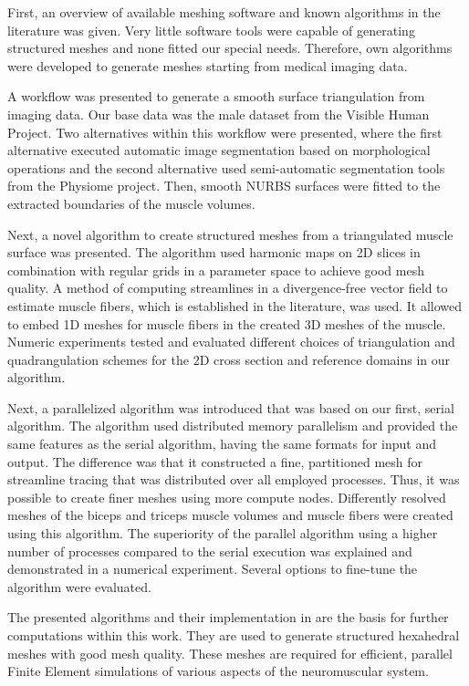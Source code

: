 First, an overview of available meshing software and known algorithms in the literature was given. Very little software tools were capable of generating structured meshes and none fitted our special needs. Therefore, own algorithms were developed to generate meshes starting from medical imaging data.

A workflow was presented to generate a smooth surface triangulation from imaging data. Our base data was the male dataset from the Visible Human Project. Two alternatives within this workflow were presented, where the first alternative executed automatic image segmentation based on morphological operations and the second alternative used semi-automatic segmentation tools from the Physiome project. Then, smooth NURBS surfaces were fitted to the extracted boundaries of the muscle volumes.

Next, a novel algorithm to create structured meshes from a triangulated muscle surface was presented. The algorithm used harmonic maps on 2D slices in combination with regular grids in a parameter space to achieve good mesh quality. A method of computing streamlines in a divergence-free vector field to estimate muscle fibers, which is established in the literature, was used. It allowed to embed 1D meshes for muscle fibers in the created 3D meshes of the muscle. Numeric experiments tested and evaluated different choices of triangulation and quadrangulation schemes for the 2D cross section and reference domains in our algorithm.

Next, a parallelized algorithm was introduced that was based on our first, serial algorithm. The algorithm used distributed memory parallelism and provided the same features as the serial algorithm, having the same formats for input and output. The difference was that it constructed a fine, partitioned mesh for streamline tracing that was distributed over all employed processes. Thus, it was possible to create finer meshes using more compute nodes. Differently resolved meshes of the biceps and triceps muscle volumes and muscle fibers were created using this algorithm. The superiority of the parallel algorithm using a higher number of processes compared to the serial execution was explained and demonstrated in a numerical experiment. Several options to fine-tune the algorithm were evaluated.

The presented algorithms and their implementation in \opendihu{} are the basis for further computations within this work. They are used to generate structured hexahedral meshes with good mesh quality. These meshes are required for efficient, parallel Finite Element simulations of various aspects of the neuromuscular system.

